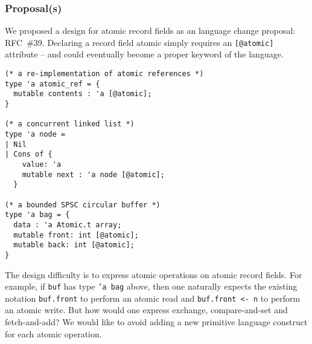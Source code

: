 \subsubsection{Proposal(s)} We proposed a design for atomic record fields as an \OCaml language change proposal: RFC~\#39. Declaring a record field atomic simply requires an \texttt{[@atomic]} attribute -- and could eventually become a proper keyword of the language.


\begin{verbatim}
(* a re-implementation of atomic references *)
type 'a atomic_ref = {
  mutable contents : 'a [@atomic];
}

(* a concurrent linked list *)
type 'a node =
| Nil
| Cons of {
    value: 'a
    mutable next : 'a node [@atomic];
  }

(* a bounded SPSC circular buffer *)
type 'a bag = {
  data : 'a Atomic.t array;
  mutable front: int [@atomic];
  mutable back: int [@atomic];
}
\end{verbatim}

The design difficulty is to express atomic operations on atomic record fields. For example, if \texttt{buf} has type \texttt{'a bag} above, then one naturally expects the existing notation \texttt{buf.front} to perform an atomic read and \texttt{buf.front <- n} to perform an atomic write. But how would one express exchange, compare-and-set and fetch-and-add? We would like to avoid adding a new primitive language construct for each atomic operation.

